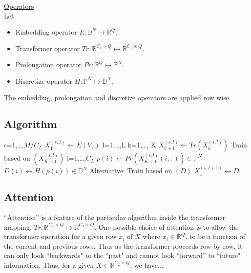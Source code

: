 \documentclass{article}
\begin{document}

\medskip
\noindent \underline{Operators}  \\
Let
\begin{itemize}
    \item Embedding operator $E: \mathbb{D}^{N} \mapsto \mathbb{R}^{Q}$.
    \item Transformer operator $Tr: \mathbb{R}^{C_L \times Q} \mapsto \mathbb{R}^{C_L \times Q}$.
    \item Prolongation operator $Pr: \mathbb{R}^{Q} \mapsto \mathbb{P}^{N}$.
    \item Discretize operator $H: \mathbb{P}^N \mapsto \mathbb{D}^N$.
\end{itemize}

The embedding, prolongation and discretize operators are applied row wise

\newpage
\subsection{Algorithm}

\begin{algorithm}
\begin{algorithmic}
\For s=1,\dots,$M/C_L$
    \State $X_1^{(s,1)} \gets E(V_s)$
    \For l=1,\dots,L
        \For k=1,\dots, K
            \State $X_{k+1}^{(s,l)} \gets Tr(X_k^{(s,l)})$
        \EndFor
        \State Train based on $(X_{K+1}^{(s,l)})$ 
        \For i=1,\dots,$C_L$
            \State $p(i) \gets Pr(X_{K+1}^{(s,l)}(i,:)) \in \mathbb{P}^N$
            \State $D(i) \gets H(p(i)) \in \mathbb{D}^N$
        \EndFor
        \State Alternative: Train based on $(D)$  
        \State $X_1^{(s,l+1)} \gets D$     
    \EndFor  
\EndFor
\end{algorithmic}
\end{algorithm}

\subsection{Attention}
``Attention'' is a feature of the particular algorithm inside the transformer mapping, $Tr: \mathbb{R}^{C_L \times Q} \mapsto \mathbb{R}^{C_L \times Q}$. One possible choice of attention is to allow the transformer operation for a given row $x_i$ of $X$ where $x_i \in \mathbb{R}^Q$, to be a function of the current and previous rows. Thus as the transformer proceeds row by row, it can only look ``backwards" to the ``past" and cannot look ``forward'' to ``future" information. Thus, for a given $X \in \mathbb{R}^{C_L \times Q}$, we have...
\end{document}
